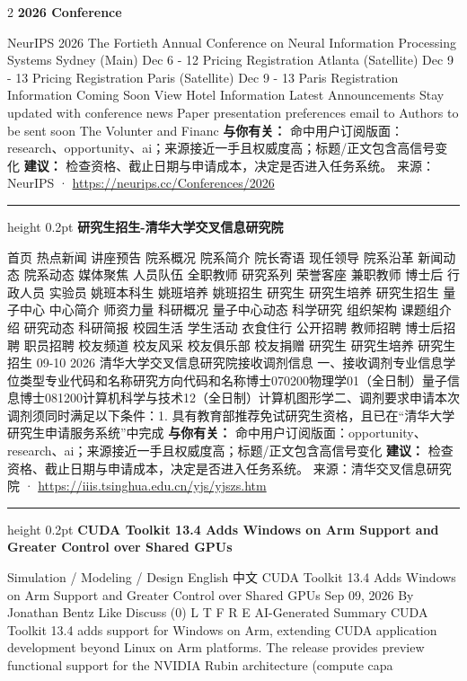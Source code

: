 \documentclass[10.5pt]{ctexart}
\begin{document}
\begin{multicols}{2}
{\large\bfseries 2026 Conference}\par
NeurIPS 2026 The Fortieth Annual Conference on Neural Information Processing Systems Sydney (Main) Dec 6 - 12 Pricing Registration Atlanta (Satellite) Dec 9 - 13 Pricing Registration Paris (Satellite) Dec 9 - 13 Paris Registration Information Coming Soon View Hotel Information Latest Announcements Stay updated with conference news Paper presentation preferences email to Authors to be sent soon The Volunter and Financ
\textbf{与你有关：} 命中用户订阅版面：research、opportunity、ai；来源接近一手且权威度高；标题/正文包含高信号变化
\textbf{建议：} 检查资格、截止日期与申请成本，决定是否进入任务系统。
{\footnotesize\color{ormuted} 来源：NeurIPS · \url{https://neurips.cc/Conferences/2026}}
\vspace{2mm}
\hrule height 0.2pt
\vspace{2mm}
{\large\bfseries 研究生招生-清华大学交叉信息研究院}\par
首页 热点新闻 讲座预告 院系概况 院系简介 院长寄语 现任领导 院系沿革 新闻动态 院系动态 媒体聚焦 人员队伍 全职教师 研究系列 荣誉客座 兼职教师 博士后 行政人员 实验员 姚班本科生 姚班培养 姚班招生 研究生 研究生培养 研究生招生 量子中心 中心简介 师资力量 科研概况 量子中心动态 科学研究 组织架构 课题组介绍 研究动态 科研简报 校园生活 学生活动 衣食住行 公开招聘 教师招聘 博士后招聘 职员招聘 校友频道 校友风采 校友俱乐部 校友捐赠 研究生 研究生培养 研究生招生 09-10 2026 清华大学交叉信息研究院接收调剂信息 一、接收调剂专业信息学位类型专业代码和名称研究方向代码和名称博士070200物理学01（全日制）量子信息博士081200计算机科学与技术12（全日制）计算机图形学二、调剂要求申请本次调剂须同时满足以下条件：1. 具有教育部推荐免试研究生资格，且已在“清华大学研究生申请服务系统”中完成
\textbf{与你有关：} 命中用户订阅版面：opportunity、research、ai；来源接近一手且权威度高；标题/正文包含高信号变化
\textbf{建议：} 检查资格、截止日期与申请成本，决定是否进入任务系统。
{\footnotesize\color{ormuted} 来源：清华交叉信息研究院 · \url{https://iiis.tsinghua.edu.cn/yjs/yjszs.htm}}
\vspace{2mm}
\hrule height 0.2pt
\vspace{2mm}
{\large\bfseries CUDA Toolkit 13.4 Adds Windows on Arm Support and Greater Control over Shared GPUs}\par
Simulation / Modeling / Design English 中文 CUDA Toolkit 13.4 Adds Windows on Arm Support and Greater Control over Shared GPUs Sep 09, 2026 By Jonathan Bentz Like Discuss (0) L T F R E AI-Generated Summary CUDA Toolkit 13.4 adds support for Windows on Arm, extending CUDA application development beyond Linux on Arm platforms. The release provides preview functional support for the NVIDIA Rubin architecture (compute capa

\end{multicols}
\end{document}
